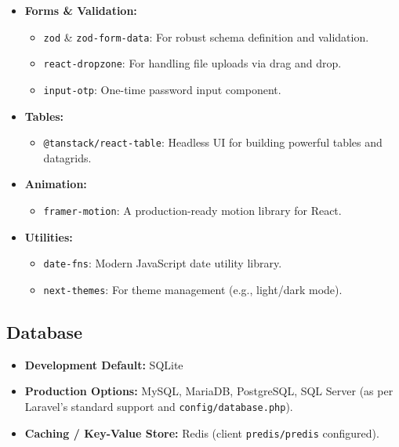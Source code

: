 \documentclass[12pt,a4paper]{article}
\begin{document}
\begin{itemize}
\begin{itemize}
\begin{itemize}
        \end{itemize}
        \item \textbf{Forms \& Validation:}
        \begin{itemize}
            \item \texttt{zod} \& \texttt{zod-form-data}: For robust schema definition and validation.
            \item \texttt{react-dropzone}: For handling file uploads via drag and drop.
            \item \texttt{input-otp}: One-time password input component.
        \end{itemize}
        \item \textbf{Tables:}
        \begin{itemize}
            \item \texttt{@tanstack/react-table}: Headless UI for building powerful tables and datagrids.
        \end{itemize}
        \item \textbf{Animation:}
        \begin{itemize}
            \item \texttt{framer-motion}: A production-ready motion library for React.
        \end{itemize}
        \item \textbf{Utilities:}
        \begin{itemize}
            \item \texttt{date-fns}: Modern JavaScript date utility library.
            \item \texttt{next-themes}: For theme management (e.g., light/dark mode).
        \end{itemize}
    \end{itemize}
\end{itemize}

\subsection*{Database}

\begin{itemize}
    \item \textbf{Development Default:} SQLite
    \item \textbf{Production Options:} MySQL, MariaDB, PostgreSQL, SQL Server (as per Laravel's standard support and \texttt{config/database.php}).
    \item \textbf{Caching / Key-Value Store:} Redis (client \texttt{predis/predis} configured).
\end{itemize}
\end{document}
